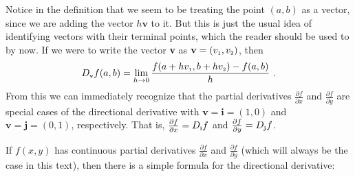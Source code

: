 Notice in the definition that we seem to be treating the point $(a,b)$ as a vector, since we are adding the
vector $h\textbf{v}$ to it. But this is just the usual idea of identifying vectors with their terminal points, which
the reader should be used to by now. If we were to write the vector \textbf{v} as $\textbf{v} = (v_{\scriptscriptstyle 1},v_{\scriptscriptstyle 2})$, then
\begin{equation}\label{eqn:dirderivpt}
 D_{\scriptscriptstyle \textbf{v}}f(a,b) = \lim_{h \to 0} \dfrac{f(a+hv_{\scriptscriptstyle 1},b+hv_{\scriptscriptstyle 2}) - f(a,b)}{h} ~.
\end{equation}
From this we can immediately recognize that the partial derivatives $\tfrac{\partial f}{\partial x}$ and
$\tfrac{\partial f}{\partial y}$ are special cases of the directional derivative with $\textbf{v} = \textbf{i} = (1,0)$
and $\textbf{v} = \textbf{j} = (0,1)$, respectively. 
That is, $\tfrac{\partial f}{\partial x} = D_{\scriptscriptstyle \textbf{i}}f$
and $\tfrac{\partial f}{\partial y} = D_{\scriptscriptstyle \textbf{j}}f$. 

If $f(x,y)$ has continuous partial derivatives $\tfrac{\partial f}{\partial x}$ and
$\tfrac{\partial f}{\partial y}$ (which will always be the case in this text), then there is a simple formula for the
directional derivative:

